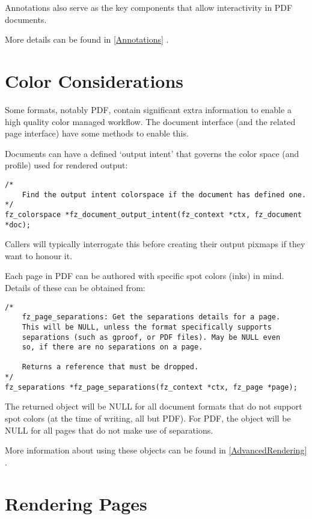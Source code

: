 \documentclass[oneside]{book}
\newcommand{\rjwref}[1] {\autoref{#1} \nameref{#1}}
\begin{document}
Annotations also serve as the key components that allow interactivity in PDF documents.

More details can be found in \rjwref{Annotations}.

\section{Color Considerations}

Some formats, notably PDF, contain significant extra information to enable a high quality color managed workflow. The document interface (and the related page interface) have some methods to enable this.

Documents can have a defined `output intent' that governs the color space (and profile) used for rendered output:

\begin{lstlisting}
/*
	Find the output intent colorspace if the document has defined one.
*/
fz_colorspace *fz_document_output_intent(fz_context *ctx, fz_document *doc);
\end{lstlisting}

Callers will typically interrogate this before creating their output pixmaps if they want to honour it.

Each page in PDF can be authored with specific spot colors (inks) in mind. Details of these can be obtained from:

\begin{lstlisting}
/*
	fz_page_separations: Get the separations details for a page.
	This will be NULL, unless the format specifically supports
	separations (such as gproof, or PDF files). May be NULL even
	so, if there are no separations on a page.

	Returns a reference that must be dropped.
*/
fz_separations *fz_page_separations(fz_context *ctx, fz_page *page);
\end{lstlisting}

The returned object will be NULL for all document formats that do not support spot colors (at the time of writing, all but PDF). For PDF, the object will be NULL for all pages that do not make use of separations.

More information about using these objects can be found in \rjwref{AdvancedRendering}.

\section{Rendering Pages}
\label{RenderingPages}
\end{document}
